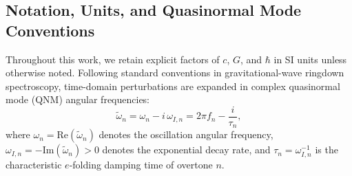\subsection{Notation, Units, and Quasinormal Mode Conventions}
\label{sec:notation}

Throughout this work, we retain explicit factors of $c$, $G$, and $\hbar$ in SI units unless otherwise noted. Following standard conventions in gravitational-wave ringdown spectroscopy, time-domain perturbations are expanded in complex quasinormal mode (QNM) angular frequencies:
\begin{equation}
    \tilde{\omega}_n = \omega_n - i\,\omega_{I,n} = 2\pi f_n - \frac{i}{\tau_n},
\end{equation}
where $\omega_n = \mathrm{Re}(\tilde{\omega}_n)$ denotes the oscillation angular frequency, $\omega_{I,n} = -\mathrm{Im}(\tilde{\omega}_n) > 0$ denotes the exponential decay rate, and $\tau_n = \omega_{I,n}^{-1}$ is the characteristic $e$-folding damping time of overtone $n$.

